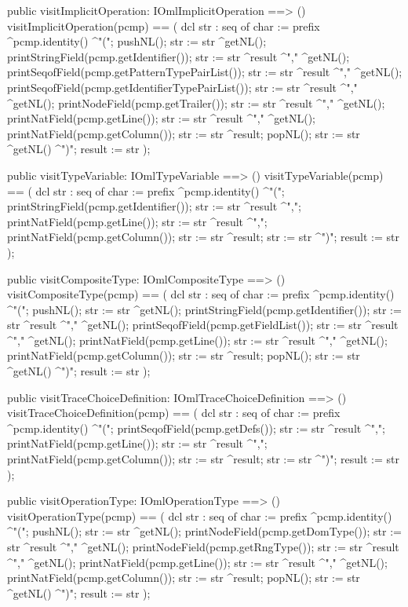 \begin{vdm_al}
  public visitImplicitOperation: IOmlImplicitOperation ==> ()
  visitImplicitOperation(pcmp) ==
    ( dcl str : seq of char := prefix ^pcmp.identity() ^"(";
      pushNL();
      str := str ^getNL();
      printStringField(pcmp.getIdentifier());
      str := str ^result ^"," ^getNL();
      printSeqofField(pcmp.getPatternTypePairList());
      str := str ^result ^"," ^getNL();
      printSeqofField(pcmp.getIdentifierTypePairList());
      str := str ^result ^"," ^getNL();
      printNodeField(pcmp.getTrailer());
      str := str ^result ^"," ^getNL();
      printNatField(pcmp.getLine());
      str := str ^result ^"," ^getNL();
      printNatField(pcmp.getColumn());
      str := str ^result;
      popNL();
      str := str ^getNL() ^")";
      result := str );

  public visitTypeVariable: IOmlTypeVariable ==> ()
  visitTypeVariable(pcmp) ==
    ( dcl str : seq of char := prefix ^pcmp.identity() ^"(";
      printStringField(pcmp.getIdentifier());
      str := str ^result ^",";
      printNatField(pcmp.getLine());
      str := str ^result ^",";
      printNatField(pcmp.getColumn());
      str := str ^result;
      str := str ^")";
      result := str );

  public visitCompositeType: IOmlCompositeType ==> ()
  visitCompositeType(pcmp) ==
    ( dcl str : seq of char := prefix ^pcmp.identity() ^"(";
      pushNL();
      str := str ^getNL();
      printStringField(pcmp.getIdentifier());
      str := str ^result ^"," ^getNL();
      printSeqofField(pcmp.getFieldList());
      str := str ^result ^"," ^getNL();
      printNatField(pcmp.getLine());
      str := str ^result ^"," ^getNL();
      printNatField(pcmp.getColumn());
      str := str ^result;
      popNL();
      str := str ^getNL() ^")";
      result := str );

  public visitTraceChoiceDefinition: IOmlTraceChoiceDefinition ==> ()
  visitTraceChoiceDefinition(pcmp) ==
    ( dcl str : seq of char := prefix ^pcmp.identity() ^"(";
      printSeqofField(pcmp.getDefs());
      str := str ^result ^",";
      printNatField(pcmp.getLine());
      str := str ^result ^",";
      printNatField(pcmp.getColumn());
      str := str ^result;
      str := str ^")";
      result := str );

  public visitOperationType: IOmlOperationType ==> ()
  visitOperationType(pcmp) ==
    ( dcl str : seq of char := prefix ^pcmp.identity() ^"(";
      pushNL();
      str := str ^getNL();
      printNodeField(pcmp.getDomType());
      str := str ^result ^"," ^getNL();
      printNodeField(pcmp.getRngType());
      str := str ^result ^"," ^getNL();
      printNatField(pcmp.getLine());
      str := str ^result ^"," ^getNL();
      printNatField(pcmp.getColumn());
      str := str ^result;
      popNL();
      str := str ^getNL() ^")";
      result := str );


\end{vdm_al}
